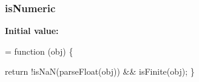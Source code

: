 \subsubsection[{\texorpdfstring{is\+Numeric}{isNumeric}}]{ is\+Numeric}\hypertarget{jquery-2_82_81-vsdoc_8js_aea21b7a3297c40d5d8862345d324796b}{}\label{jquery-2_82_81-vsdoc_8js_aea21b7a3297c40d5d8862345d324796b}
{\bfseries Initial value\+:}
\begin{DoxyCode}
= \textcolor{keyword}{function} (obj) \{
        

        \textcolor{keywordflow}{return} !isNaN(parseFloat(obj)) && isFinite(obj);
    \}
\end{DoxyCode}
